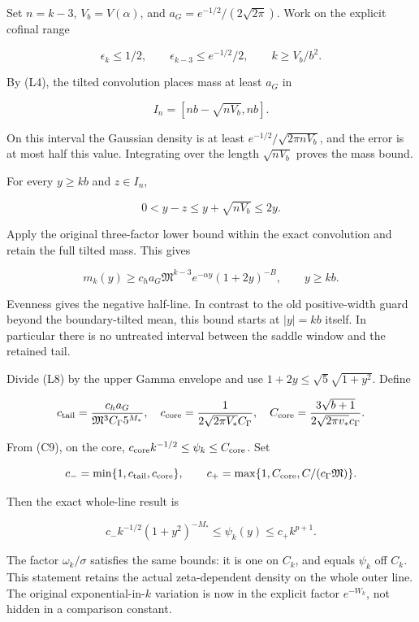 Set \(n=k-3\), \(V_b=V(\alpha)\), and
\(a_G=e^{-1/2}/(2\sqrt{2\pi})\). Work on the explicit cofinal range

\[
\epsilon_k\le1/2,\qquad
\epsilon_{k-3}\le e^{-1/2}/2,\qquad
k\ge V_b/b^2.
\tag{L7}
\]

By (L4), the tilted convolution places mass at least \(a_G\) in

\[
I_n=[nb-\sqrt{nV_b},nb].
\]

On this interval the Gaussian density is at least
\(e^{-1/2}/\sqrt{2\pi nV_b}\), and the error is at most half this value. Integrating over the length \(\sqrt{nV_b}\) proves the mass bound.

For every \(y\ge kb\) and \(z\in I_n\),

\[
0<y-z\le y+\sqrt{nV_b}\le2y.
\]

Apply the original three-factor lower bound within the exact convolution and retain the full tilted mass. This gives

\[
\boxed{m_k(y)\ge c_h a_G\mathfrak M^{k-3}e^{-\alpha y}(1+2y)^{-B},
\qquad y\ge kb.}
\tag{L8}
\]

Evenness gives the negative half-line. In contrast to the old positive-width guard beyond the boundary-tilted mean, this bound starts at \(|y|=kb\) itself. In particular there is no untreated interval between the saddle window and the retained tail.

Divide (L8) by the upper Gamma envelope and use
\(1+2y\le\sqrt5\sqrt{1+y^2}\). Define

\[
c_{\rm tail}=\frac{c_h a_G}{\mathfrak M^3C_\Gamma 5^{M_*}},
\quad
c_{\rm core}=\frac1{2\sqrt{2\pi V_*}C_\Gamma},
\quad
C_{\rm core}=\frac{3\sqrt{b+1}}{2\sqrt{2\pi v_*}c_\Gamma}.
\]

From (C9), on the core,
\(c_{\rm core}k^{-1/2}\le\psi_k\le C_{\rm core}\). Set

\[
c_- =\min\{1,c_{\rm tail},c_{\rm core}\},\qquad
c_+=\max\{1,C_{\rm core},C/(c_\Gamma\mathfrak M)\}.
\]

Then the exact whole-line result is

\[
\boxed{c_-k^{-1/2}(1+y^2)^{-M_*}\le\psi_k(y)
\le c_+k^{p+1}.}
\tag{L9}
\]

The factor \(\omega_k/\sigma\) satisfies the same bounds: it is one on \(C_k\), and equals \(\psi_k\) off \(C_k\). This statement retains the actual zeta-dependent density on the whole outer line. The original exponential-in-\(k\) variation is now in the explicit factor \(e^{-W_k}\), not hidden in a comparison constant.

